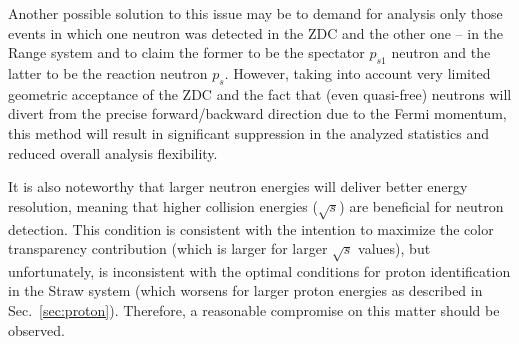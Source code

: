 Another possible solution to this issue may be to demand for analysis only those events in which one neutron was detected in the ZDC and the other one -- in the Range system and to claim the former to be the spectator $p_{s1}$ neutron and the latter to be the reaction neutron $p_{s}$. However, taking into account very limited geometric acceptance of the ZDC and the fact that (even quasi-free) neutrons will divert from the precise forward/backward direction due to the Fermi momentum, this method will result in significant suppression in the analyzed statistics and reduced overall analysis flexibility.

It is also noteworthy that larger neutron energies will deliver better energy resolution, meaning that higher collision energies ($\sqrt{s}$) are beneficial for neutron detection. This condition is consistent with the intention to maximize the color transparency contribution (which is larger for larger $\sqrt{s}$ values), but unfortunately, is inconsistent with the optimal conditions for proton identification in the Straw system (which worsens for larger proton energies as described in Sec.~\ref{sec:proton}). Therefore, a reasonable compromise on this matter should be observed.
    
  

